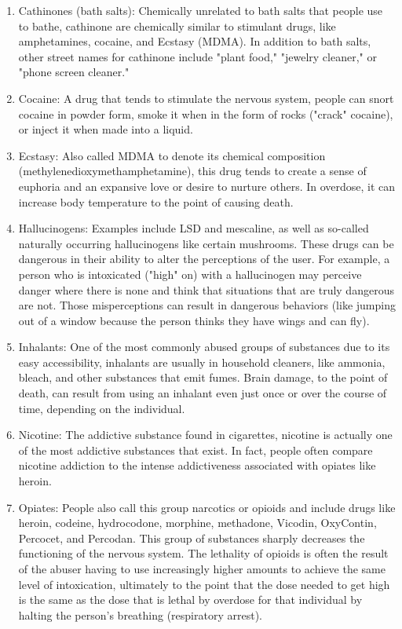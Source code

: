 \documentclass{report}
\begin{document}
\begin{enumerate}
    \item Cathinones (bath salts): Chemically unrelated to bath salts that people use to bathe, cathinone are chemically similar to stimulant drugs, like amphetamines, cocaine, and Ecstasy (MDMA). In addition to bath salts, other street names for cathinone include "plant food," "jewelry cleaner," or "phone screen cleaner."

    \item Cocaine: A drug that tends to stimulate the nervous system, people can snort cocaine in powder form, smoke it when in the form of rocks ("crack" cocaine), or inject it when made into a liquid.
    
    \item Ecstasy: Also called MDMA to denote its chemical composition (methylenedioxymethamphetamine), this drug tends to create a sense of euphoria and an expansive love or desire to nurture others. In overdose, it can increase body temperature to the point of causing death.
    
    \item  Hallucinogens: Examples include LSD and mescaline, as well as so-called naturally occurring hallucinogens like certain mushrooms. These drugs can be dangerous in their ability to alter the perceptions of the user. For example, a person who is intoxicated ("high" on) with a hallucinogen may perceive danger where there is none and think that situations that are truly dangerous are not. Those misperceptions can result in dangerous behaviors (like jumping out of a window because the person thinks they have wings and can fly).
    
    \item Inhalants: One of the most commonly abused groups of substances due to its easy accessibility, inhalants are usually in household cleaners, like ammonia, bleach, and other substances that emit fumes. Brain damage, to the point of death, can result from using an inhalant even just once or over the course of time, depending on the individual.
    
    \item Nicotine: The addictive substance found in cigarettes, nicotine is actually one of the most addictive substances that exist. In fact, people often compare nicotine addiction to the intense addictiveness associated with opiates like heroin.
    
    \item Opiates: People also call this group narcotics or opioids and include drugs like heroin, codeine, hydrocodone, morphine, methadone, Vicodin, OxyContin, Percocet, and Percodan. This group of substances sharply decreases the functioning of the nervous system. The lethality of opioids is often the result of the abuser having to use increasingly higher amounts to achieve the same level of intoxication, ultimately to the point that the dose needed to get high is the same as the dose that is lethal by overdose for that individual by halting the person's breathing (respiratory arrest).
    

\end{enumerate}
\end{document}
